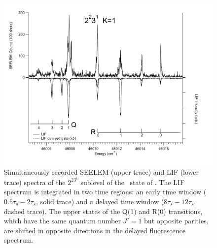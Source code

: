 \documentclass[12pt]{mitthesis}
\begin{document}
\begin{figure}
  \caption{Simultaneously recorded SEELEM (upper trace) and LIF (lower
    trace) spectra of the $2^23^1$  sublevel of the \astate\
    state of .  The LIF spectrum is integrated in two time
    regions: an early time window ($0.5\tau_s-2\tau_s$, solid trace)
    and a delayed time window ($8\tau_s-12\tau_s$, dashed trace).  The
    upper states of the Q(1) and R(0) transitions, which have the same
    quantum number $J'=1$ but opposite parities, are shifted in
    opposite directions in the delayed fluorescence spectrum.}
  \label{fig:spectrum-2231}
  \centering
  \vspace{1cm}
  \includegraphics[width=7in,angle=90]{spectrum-2231-q4r3.pdf}
\end{figure}
\end{document}
